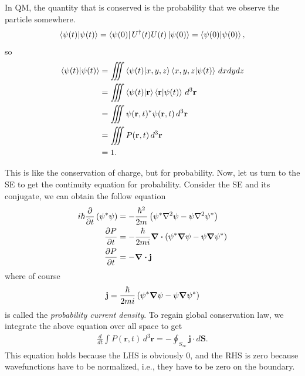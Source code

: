 \documentclass{book}
\theoremstyle{definition}
\newcommand{\p}{\partial}
\newcommand{\f}[2]{\frac{#1}{#2}}
\newcommand{\lp}{\left(}
\newcommand{\rp}{\right)}
\begin{document}
In QM, the quantity that is conserved is the probability that we observe the particle somewhere. 
\begin{align}
\braket{\psi(t)} = \bra{\psi(0)}U^\dagger(t)U(t)\ket{\psi(0)} = \braket{\psi(0)},
\end{align}
so
\begin{align}
\braket{\psi(t)} &= \iiint \braket{\psi(t)}{x,y,z}\braket{x,y,z}{\psi(t)}\,dxdydz\\
&= \iiint \braket{\psi(t)}{\mathbf{r}}\braket{\mathbf{r}}{\psi(t)}\,d^3\mathbf{r}\\
&= \iiint \psi(\mathbf{r},t)^* \psi(\mathbf{r},t)\,d^3\mathbf{r}\\
&= \iiint P(\mathbf{r},t)\,d^3\mathbf{r}\\
&= 1.
\end{align}

This is like the conservation of charge, but for probability. Now, let us turn to the SE to get the continuity equation for probability. Consider the SE and its conjugate, we can obtain the follow equation
\begin{align}
i\hbar \f{\p}{\p t} \lp \psi^*\psi \rp &= -\f{\hbar^2}{2m}\lp \psi^*\laplacian\psi - \psi \laplacian\psi^* \rp\\
\f{\p P}{\p t} &= -\f{\hbar}{2mi} \div \lp \psi^*\grad{\psi} - \psi \grad \psi^* \rp\\
\f{\p P}{\p t} &= -\div \mathbf{j}
\end{align}
where of course
\begin{align}
\mathbf{j} = \f{\hbar}{2mi} \lp \psi^*\grad{\psi} - \psi \grad \psi^* \rp
\end{align}
is called the \textit{probability current density}. To regain global conservation law, we integrate the above equation over all space to get
\begin{align}
\f{d}{dt}\int P(\mathbf{r},t)\,d^3\mathbf{r} = -\oint_{S_\infty} \mathbf{j}\cdot d\mathbf{S}.
\end{align}
This equation holds because the LHS is obviously 0, and the RHS is zero because wavefunctions have to be normalized, i.e., they have to be zero on the boundary. 
\end{document}

